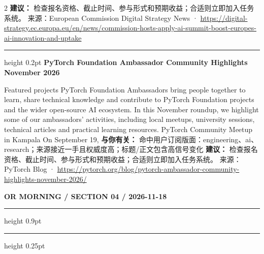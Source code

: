 \documentclass[10.5pt]{ctexart}
\begin{document}
\begin{multicols}{2}
\textbf{建议：} 检查报名资格、截止时间、参与形式和预期收益；合适则立即加入任务系统。
{\footnotesize\color{ormuted} 来源：European Commission Digital Strategy News · \url{https://digital-strategy.ec.europa.eu/en/news/commission-hosts-apply-ai-summit-boost-europes-ai-innovation-and-uptake}}
\vspace{2mm}
\hrule height 0.2pt
\vspace{2mm}
{\large\bfseries PyTorch Foundation Ambassador Community Highlights November 2026}\par
Featured projects PyTorch Foundation Ambassadors bring people together to learn, share technical knowledge and contribute to PyTorch Foundation projects and the wider open-source AI ecosystem. In this November roundup, we highlight some of our ambassadors’ activities, including local meetups, university sessions, technical articles and practical learning resources. PyTorch Community Meetup in Kampala On September 19,
\textbf{与你有关：} 命中用户订阅版面：engineering、ai、research；来源接近一手且权威度高；标题/正文包含高信号变化
\textbf{建议：} 检查报名资格、截止时间、参与形式和预期收益；合适则立即加入任务系统。
{\footnotesize\color{ormuted} 来源：PyTorch Blog · \url{https://pytorch.org/blog/pytorch-ambassador-community-highlights-november-2026/}}
\end{multicols}
\newpage
{\small\bfseries OR MORNING / SECTION 04 / 2026-11-18}
\vspace{2mm}
\hrule height 0.9pt
\vspace{1.5mm}
\hrule height 0.25pt
\vspace{4mm}
\end{document}
